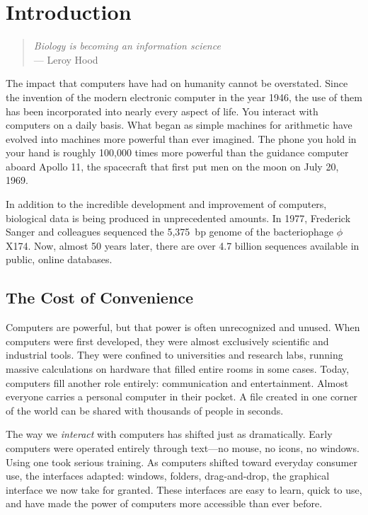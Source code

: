 \chapter{Introduction}

\begin{quote}
\textit{Biology is becoming an information science} \\
\hspace*{\fill}--- Leroy Hood
\end{quote}

The impact that computers have had on humanity cannot be overstated. Since the invention of the modern electronic computer in the year 1946, the use of them has been incorporated into nearly every aspect of life. You interact with computers on a daily basis. What began as simple machines for arithmetic have evolved into machines more powerful than ever imagined. The phone you hold in your hand is roughly 100{,}000 times more powerful than the guidance computer aboard Apollo 11, the spacecraft that first put men on the moon on July 20, 1969.

In addition to the incredible development and improvement of computers, biological data is being produced in unprecedented amounts. In 1977, Frederick Sanger and colleagues sequenced the 5{,}375~bp genome of the bacteriophage $\phi$X174. Now, almost 50 years later, there are over 4.7 billion sequences available in public, online databases.

\section{The Cost of Convenience}

Computers are powerful, but that power is often unrecognized and unused. When computers were first developed, they were almost exclusively scientific and industrial tools. They were confined to universities and research labs, running massive calculations on hardware that filled entire rooms in some cases. Today, computers fill another role entirely: communication and entertainment. Almost everyone carries a personal computer in their pocket. A file created in one corner of the world can be shared with thousands of people in seconds.

The way we \emph{interact} with computers has shifted just as dramatically. Early computers were operated entirely through text---no mouse, no icons, no windows. Using one took serious training. As computers shifted toward everyday consumer use, the interfaces adapted: windows, folders, drag-and-drop, the graphical interface we now take for granted. These interfaces are easy to learn, quick to use, and have made the power of computers more accessible than ever before.

